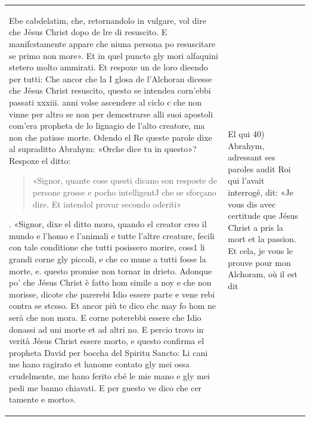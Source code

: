 \begin{longtable}{p{}p{}}
Ebe cabdelatim, che, retornandolo in vulgare, vol dire che Jésus Christ dopo de lre di resuscito. E manifcstamente appare che niuna persona po resuscitare se primo non more».  Et in  quel
puncto gly mori alfaquini stetero molto ammirati. Et respoxe un de loro dieendo per tutti: Che ancor che la I glosa de l'Alchoran dicesse che Jésus Christ resuscito, questo se intendea corn'ebbi
passati xxxiii. anni volse ascendere al ciclo c che non vinne per altro se non per demostrarse alli suoi apostoli com'era propheta de lo lignagio de l'alto creatore, ma non che patisse morte. Odendo el Re queste parole dixe al supraditto Abrahym: «Orche dice tu in questo»? Respoxe el ditto: \begin{quote}
    «Signor, quante cose questi dicano son resposte de persone grosse e pocho intelligentJ che se sforçano dire. Et intendol provar secondo oderiti»
\end{quote}. «Signor, dixe el ditto moro, quando el creator creo il mundo e l'homo e l'animali e tutte l'altre creature, fecili con tale conditione che tutti posissero morire, coss1 li grandi corne gly piccoli, e che co  mune a tutti fosse la morte, e. questo promise non tornar in  drieto. Adonque po' che Jésus Christ è fatto hom simile a noy e che non morisse, dicote che parerebi Idio essere parte e vene  rebi contra se stcsso. Et ancor più te dico chc may fo hom ne serà che non mora. E corne poterebbi essere che Idio donassi ad uni morte et ad altri no. E percio trovo in verità Jésus Christ essere morto, e questo confirma el propheta David per boccha del Spiritu Sancto: Li cani me hano ragirato et hanome contato gly mei ossa crudelmente, me hano ferito cbé le mie mano e gly mei pedi me banno chiavati. E per guesto ve dico che cer  tamente e morto».      & El qui
40) Abrahym, adressant ses paroles audit Roi qui l'avait interrogé, dit: «Je vous dis avec certitude que Jésus Christ a pris la mort et la passion. Et cela, je vous le prouve pour mon Alchoram, où il est dit
  

\end{longtable}
